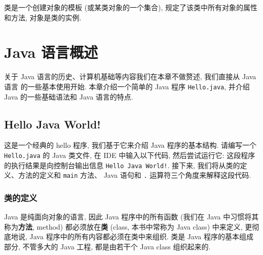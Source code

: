 \documentclass[10pt,UTF8]{book} %
\begin{document}
类是一个创建对象的模板 (或某类对象的一个集合), 规定了该类中所有对象的属性和方法, 
对象是类的实例.

\chapter{Java 语言概述}

\quad\quad 关于 Java 语言的历史、计算机基础等内容我们在本章不做赘述, 我们直接从 Java 语言
的一些基本使用开始. 本章介绍一个简单的 Java 程序 \lstinline|Hello.java|, 并介绍 Java
的一些基础语法和 Java 语言的特点.

\section{Hello Java World!}


\begin{example}
    \label{helloJavaWorld}
    这是一个经典的 hello 程序, 我们基于它来介绍 Java 程序的基本结构. 请编写一个
    \lstinline|Hello.java| 的 Java 类文件, 在 IDE 中输入以下代码, 然后尝试运行它:
    这段程序的执行结果是向控制台输出信息 \lstinline|Hello Java World!|.
    接下来, 我们将从类的定义、方法的定义和 \lstinline|main| 方法、
    Java 语句和 \lstinline|.| 运算符三个角度来解释这段代码.
\end{example}

\subsection{类的定义}

Java 是纯面向对象的语言, 因此 Java 程序中的所有函数 
(我们在 Java 中习惯将其称为\textbf{方法}, method) 都必须放在\textbf{类} (class,
本书中常称为 Java class) 中来定义,
更彻底地说, Java 程序中的所有内容都必须在类中来组织.
类是 Java 程序的基本组成部分, 不管多大的 Java 工程, 都是由若干个 Java class 组织起来的.
\end{document}
